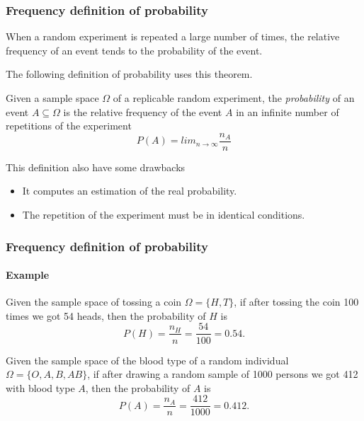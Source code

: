 \begin{frame}
\frametitle{Frequency definition of probability}
\begin{theorem}
When a random experiment is repeated a large number of times, the relative frequency of an event tends to the probability of the event.
\end{theorem}

The following definition of probability uses this theorem.
\begin{definition}
Given a sample space $\Omega$ of a replicable random experiment, the \emph{probability} of an event $A\subseteq \Omega$ is the relative frequency of the event $A$ in an infinite number of repetitions of the experiment 
\[
P(A) = lim_{n\rightarrow \infty}\frac{n_A}{n}
\]
\end{definition}

This definition also have some drawbacks
\begin{itemize}
\item It computes an estimation of the real probability. %
\item The repetition of the experiment must be in identical conditions.
\end{itemize}
\end{frame}


\begin{frame}
\frametitle{Frequency definition of probability}
\framesubtitle{Example}
Given the sample space of tossing a coin $\Omega=\{H,T\}$, if after tossing the coin 100 times we got 54 heads, then the probability of $H$ is
\[
P(H) = \frac{n_H}{n} = \frac{54}{100} = 0.54.
\]

Given the sample space of the blood type of a random individual $\Omega=\{O,A,B,AB\}$, if after drawing a random sample of 1000 persons we got 412 with blood type $A$, then the probability of $A$ is 
\[
P(A) = \frac{n_A}{n} = \frac{412}{1000} = 0.412.
\]
\end{frame}


